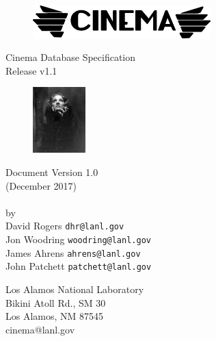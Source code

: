 \thispagestyle{empty}

\begin{ttfamily}
\begin{center}
 \ \ \\
\vspace{1.0 in}
\begin{figure}[h!]
\centering
\includegraphics[height=0.5in]{img/cinema_logo_name}
\end{figure}
\vspace{1.0 in}
Cinema Database Specification \\
\dietrich Release v1.1\\
\bigskip
\begin{figure}[h!]
\centering
\includegraphics[height=1.0in]{img/dietrich_spec_logo}
\end{figure}
\bigskip
Document Version 1.0 \\
(December 2017)\\
\LAUR\\
\bigskip
\bigskip
\bigskip
\bigskip
by \\
\bigskip
David Rogers  \texttt{\small dhr@lanl.gov}\\
Jon Woodring  \texttt{\small woodring@lanl.gov}\\
James Ahrens  \texttt{\small ahrens@lanl.gov}\\
John Patchett \texttt{\small patchett@lanl.gov}\\
\end{center}
\vspace{1.0 in}
\begin{flushright}
Los Alamos National Laboratory\\
Bikini Atoll Rd., SM 30\\
Los Alamos, NM 87545\\
cinema@lanl.gov\\
\end{flushright}
\end{ttfamily}
\newpage

\tableofcontents
\newpage

